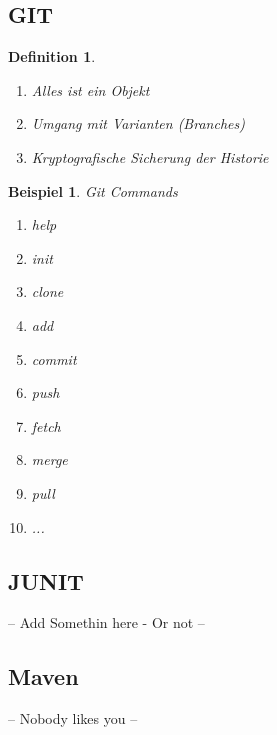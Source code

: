 \documentclass[a4paper]{article}
\theoremstyle{break}
\newtheorem{defi}{Definition}[section]
\newtheorem{ex}{Beispiel}[section]
\begin{document}
    \newpage
    \subsection{GIT}
    \begin {defi}
      \begin{enumerate}
        \item Alles ist ein Objekt
        \item Umgang mit Varianten (Branches)
        \item Kryptografische Sicherung der Historie
      \end {enumerate}
    \end {defi}

    \begin {ex}
      Git Commands
      \begin{enumerate}
      \item help
      \item init
      \item clone
      \item add
      \item commit
      \item push
      \item fetch
      \item merge
      \item pull
        \item ...
      \end{enumerate}
    \end {ex}

    \subsection {JUNIT}
     -- Add Somethin here - Or not --
     \subsection {Maven}
     -- Nobody likes you --


    
    
\end{document}
